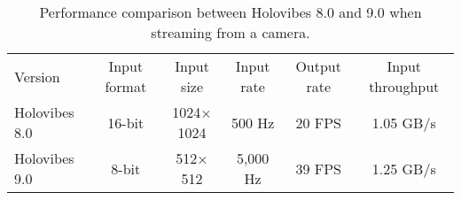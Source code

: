 \renewcommand{\arraystretch}{1.25}
\begin{table*}[t]
    \begin{ruledtabular}
        \begin{tabular}{lccccc}
            \textrm{Version}&
            \textrm{Input format}&
            \textrm{Input size}&
            \textrm{Input rate}&
            \textrm{Output rate}&
            \textrm{Input throughput}\\
            \colrule
            Holovibes 8.0 & 16-bit & 1024$\times$1024 & 500 Hz & 20 FPS & 1.05 GB/s \\
            \colrule
            Holovibes 9.0 & 8-bit & 512$\times$512 & 5,000 Hz & 39 FPS & 1.25 GB/s \\
        \end{tabular}
    \end{ruledtabular}
    \caption{\label{tab:results} Performance comparison between Holovibes 8.0 and 9.0 when streaming from a camera.}
\end{table*}
